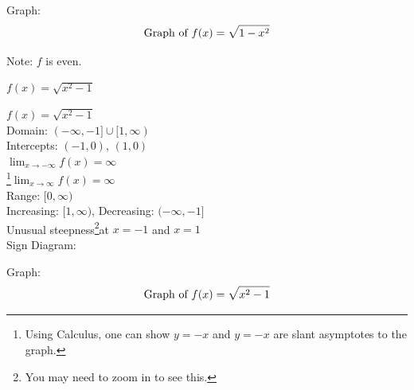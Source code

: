 \documentclass{ximera}
\begin{document}
\begin{question}
\begin{problem}
\begin{solution}
% 





Graph: \\

$$\text{Graph of $f(x)=\sqrt{1-x^2}$}$$

Note:  $f$ is even.
\end{solution}
\end {problem}

\begin {problem}
$f(x) = \sqrt{x^2-1}$

\begin{solution}
$f(x) = \sqrt{x^2-1}$\\
Domain: $(-\infty, -1] \cup [1,\infty)$\\
Intercepts: $(-1,0)$, $(1,0)$\\
$ \lim_{x \rightarrow -\infty} f(x) = \infty$\\
\footnote{Using Calculus, one can show $y = -x$ and $y = -x$ are slant asymptotes to the graph.}$ \lim_{x \rightarrow \infty} f(x) = \infty$\\
Range:   $[0, \infty)$ \\
Increasing: $[1, \infty)$, Decreasing: $(-\infty, -1]$ \\
Unusual steepness\footnote{You may need to zoom in to see this.}at $x = -1$ and $x = 1$\\
Sign Diagram: \\

% 

Graph: \\

$$\text{Graph of $f(x)=\sqrt{x^2-1}$}$$


\end{solution}
\end{problem}
\end{question}
\end{document}

